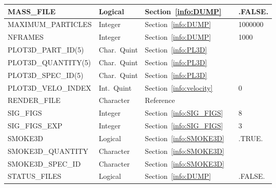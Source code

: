 \documentclass[11pt]{book}
\begin{document}
\begin{longtable}{@{\extracolsep{\fill}}|l|l|l|l|l|}
{\ct MASS\_FILE}                    & Logical      & Section~\ref{info:DUMP}                &           & {\ct .FALSE.}                  \\ \hline
{\ct MAXIMUM\_PARTICLES}            & Integer      & Section~\ref{info:DUMP}                &           & 1000000                        \\ \hline
{\ct NFRAMES}                       & Integer      & Section~\ref{info:DUMP}                &           & 1000                           \\ \hline
{\ct PLOT3D\_PART\_ID(5)}           & Char.~Quint  & Section~\ref{info:PL3D}                &           &                                \\ \hline
{\ct PLOT3D\_QUANTITY(5)}           & Char.~Quint  & Section~\ref{info:PL3D}                &           &                                \\ \hline
{\ct PLOT3D\_SPEC\_ID(5)}           & Char.~Quint  & Section~\ref{info:PL3D}                &           &                                \\ \hline
{\ct PLOT3D\_VELO\_INDEX}           & Int.~Quint   & Section~\ref{info:velocity}            &           &  0                             \\ \hline
{\ct RENDER\_FILE}                  & Character    & Reference~\cite{Smokeview_Users_Guide} &           &                                \\ \hline
{\ct SIG\_FIGS}                     & Integer      & Section~\ref{info:SIG_FIGS}            &           & 8                              \\ \hline
{\ct SIG\_FIGS\_EXP}                & Integer      & Section~\ref{info:SIG_FIGS}            &           & 3                              \\ \hline
{\ct SMOKE3D}                       & Logical      & Section~\ref{info:SMOKE3D}             &           & {\ct .TRUE.}                   \\ \hline
{\ct SMOKE3D\_QUANTITY}             & Character    & Section~\ref{info:SMOKE3D}             &           &                                \\ \hline
{\ct SMOKE3D\_SPEC\_ID}             & Character    & Section~\ref{info:SMOKE3D}             &           &                                \\ \hline
{\ct STATUS\_FILES}                 & Logical      & Section~\ref{info:DUMP}                &           & {\ct .FALSE.}                  \\ \hline

\end{longtable}
\end{document}
